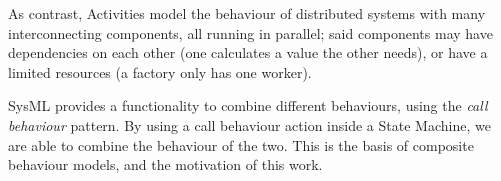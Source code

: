 As contrast, Activities model the behaviour of distributed systems with many interconnecting components, all running in parallel; said components may have dependencies on each other (one calculates a value the other needs), or have a limited resources (a factory only has one worker).

SysML provides a functionality to combine different behaviours, using the \emph{call behaviour} pattern. By using a call behaviour action inside a State Machine, we are able to combine the behaviour of the two. This is the basis of composite behaviour models, and the motivation of this work. 
\fi